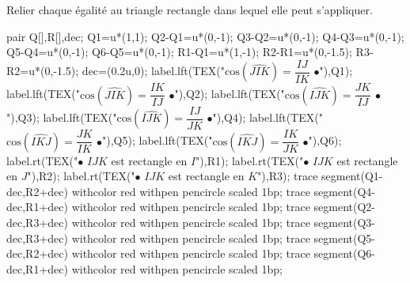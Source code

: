\begin{corrige}
        Relier chaque égalité au triangle rectangle dans lequel elle peut s'appliquer.
    \begin{center}
        \begin{Geometrie}[CoinBG={(-2u,-5u)}]
            pair Q[],R[],dec;
            Q1=u*(1,1);
            Q2-Q1=u*(0,-1);
            Q3-Q2=u*(0,-1);
            Q4-Q3=u*(0,-1);
            Q5-Q4=u*(0,-1);
            Q6-Q5=u*(0,-1);
            R1-Q1=u*(1,-1);
            R2-R1=u*(0,-1.5);
            R3-R2=u*(0,-1.5);
            dec=(0.2u,0);
            label.lft(TEX("$\text{cos}(\widehat{JIK})=\dfrac{IJ}{IK}$ $\bullet$"),Q1);
            label.lft(TEX("$\text{cos}(\widehat{JIK})=\dfrac{IK}{IJ}$ $\bullet$"),Q2);
            label.lft(TEX("$\text{cos}(\widehat{IJK})=\dfrac{JK}{IJ}$ $\bullet$"),Q3);
            label.lft(TEX("$\text{cos}(\widehat{IJK})=\dfrac{IJ}{JK}$ $\bullet$"),Q4);
            label.lft(TEX("$\text{cos}(\widehat{IKJ})=\dfrac{JK}{IK}$ $\bullet$"),Q5);
            label.lft(TEX("$\text{cos}(\widehat{IKJ})=\dfrac{IK}{JK}$ $\bullet$"),Q6);
            label.rt(TEX("$\bullet$ $IJK$ est rectangle en $I$"),R1);
            label.rt(TEX("$\bullet$ $IJK$ est rectangle en $J$"),R2);
            label.rt(TEX("$\bullet$ $IJK$ est rectangle en $K$"),R3);
            trace segment(Q1-dec,R2+dec) withcolor red withpen pencircle scaled 1bp;
            trace segment(Q4-dec,R1+dec) withcolor red withpen pencircle scaled 1bp;
            trace segment(Q2-dec,R3+dec) withcolor red withpen pencircle scaled 1bp;
            trace segment(Q3-dec,R3+dec) withcolor red withpen pencircle scaled 1bp;
            trace segment(Q5-dec,R2+dec) withcolor red withpen pencircle scaled 1bp;
            trace segment(Q6-dec,R1+dec) withcolor red withpen pencircle scaled 1bp;
        \end{Geometrie}
    \end{center}
\end{corrige}
